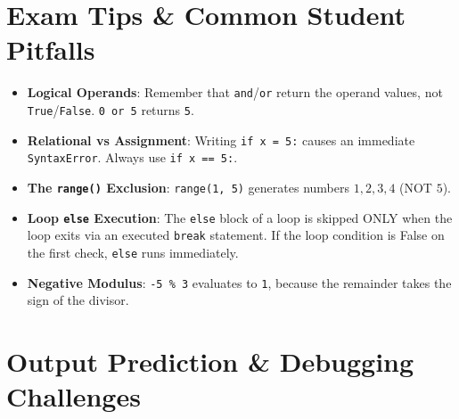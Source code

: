 \section{Exam Tips \& Common Student Pitfalls}

\begin{examtip}
\begin{itemize}[leftmargin=1.5em]
    \item \textbf{Logical Operands}: Remember that \texttt{and}/\texttt{or} return the operand values, not \texttt{True}/\texttt{False}. \texttt{0 or 5} returns \texttt{5}.
    \item \textbf{Relational vs Assignment}: Writing \texttt{if x = 5:} causes an immediate \texttt{SyntaxError}. Always use \texttt{if x == 5:}.
    \item \textbf{The \texttt{range()} Exclusion}: \texttt{range(1, 5)} generates numbers $1, 2, 3, 4$ (NOT $5$).
    \item \textbf{Loop \texttt{else} Execution}: The \texttt{else} block of a loop is skipped ONLY when the loop exits via an executed \texttt{break} statement. If the loop condition is False on the first check, \texttt{else} runs immediately.
    \item \textbf{Negative Modulus}: \texttt{-5 \% 3} evaluates to \texttt{1}, because the remainder takes the sign of the divisor.
\end{itemize}
\end{examtip}

\section{Output Prediction \& Debugging Challenges}

